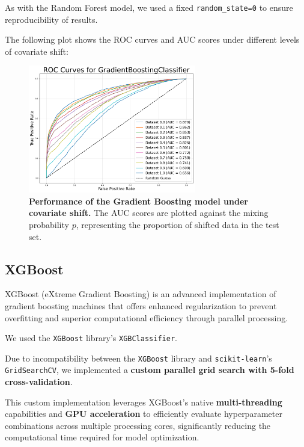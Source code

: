 As with the Random Forest model, we used a fixed \texttt{random\_state=0} to ensure reproducibility of results.

The following plot shows the ROC curves and AUC scores under different levels of covariate shift:

\vspace{0.5em}

\begin{figure}[H]
	\centering
	\includegraphics[width=0.65\textwidth]{assets/gbc_auc.png}
	\caption{\textbf{Performance of the Gradient Boosting model under covariate shift.} \newline The AUC scores are plotted against the mixing probability $p$, representing the proportion of shifted data in the test set.}
	\label{fig:gradient-boosting-perf}
\end{figure}

\newpage

\subsection{XGBoost}

XGBoost (eXtreme Gradient Boosting) is an advanced implementation of gradient boosting machines that offers enhanced regularization to prevent overfitting and superior computational efficiency through parallel processing.

We used the \texttt{XGBoost} library's \texttt{XGBClassifier}.

Due to incompatibility between the \texttt{XGBoost} library and \texttt{scikit-learn}'s \texttt{GridSearchCV}, we implemented a \textbf{custom parallel grid search with 5-fold cross-validation}.

This custom implementation leverages XGBoost's native \textbf{multi-threading} capabilities and \textbf{GPU acceleration} to efficiently evaluate hyperparameter combinations across multiple processing cores, significantly reducing the computational time required for model optimization.

